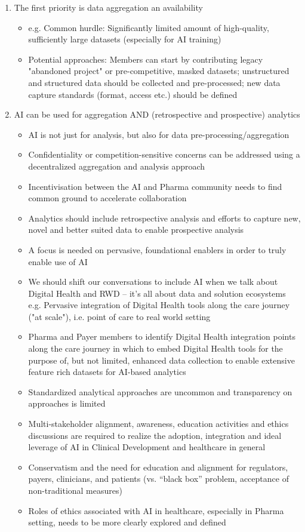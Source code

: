 \begin{enumerate}
\item The first priority is data aggregation an availability
\begin{itemize}
\item e.g. Common hurdle: Significantly limited amount of high-quality, sufficiently large datasets (especially for AI training)
\item Potential approaches: Members can start by contributing legacy "abandoned project" or pre-competitive, masked datasets; unstructured and structured data should be collected and pre-processed; new data capture standards (format, access etc.) should be defined
\end{itemize}

\item AI can be used for aggregation AND (retrospective and prospective) analytics
\begin{itemize}
\item AI is not just for analysis, but also for data pre-processing/aggregation
\item Confidentiality or competition-sensitive concerns can be addressed using a decentralized aggregation and analysis approach
\item Incentivisation between the AI and Pharma community needs to find common ground to accelerate collaboration
\item Analytics should include retrospective analysis and efforts to capture new, novel and better suited data to enable prospective analysis
\item A focus is needed on pervasive, foundational enablers in order to truly enable use of AI
\item We should shift our conversations to include AI when we talk about Digital Health and RWD – it's all about data and solution ecosystems
e.g. Pervasive integration of Digital Health tools along the care journey ("at scale"), i.e. point of care to real world setting
\item Pharma and Payer members to identify Digital Health integration points along the care journey in which to embed Digital Health tools for the purpose of, but not limited, enhanced data collection to enable extensive feature rich datasets for AI-based analytics
\item Standardized analytical approaches are uncommon and transparency on approaches is limited
\item Multi-stakeholder alignment, awareness, education activities and ethics discussions are required to realize the adoption, integration and ideal leverage of AI in Clinical Development and healthcare in general
\item Conservatism and the need for education and alignment for regulators, payers, clinicians, and patients (vs. ``black box'' problem, acceptance of non-traditional measures)
\item Roles of ethics associated with AI in healthcare, especially in Pharma setting, needs to be more clearly explored and defined
\end{itemize}
\end{enumerate}